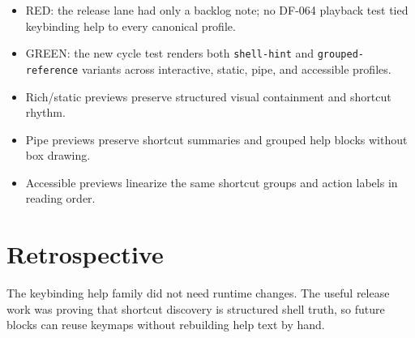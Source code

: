 \begin{itemize}
\tightlist
\item
  RED: the release lane had only a backlog note; no DF-064 playback test tied keybinding help to every canonical profile.
\item
  GREEN: the new cycle test renders both \texttt{s\allowbreak{}h\allowbreak{}e\allowbreak{}l\allowbreak{}l\allowbreak{}-\allowbreak{}h\allowbreak{}i\allowbreak{}n\allowbreak{}t} and \texttt{g\allowbreak{}r\allowbreak{}o\allowbreak{}u\allowbreak{}p\allowbreak{}e\allowbreak{}d\allowbreak{}-\allowbreak{}r\allowbreak{}e\allowbreak{}f\allowbreak{}e\allowbreak{}r\allowbreak{}e\allowbreak{}n\allowbreak{}c\allowbreak{}e} variants across interactive, static, pipe, and accessible profiles.
\item
  Rich/static previews preserve structured visual containment and shortcut rhythm.
\item
  Pipe previews preserve shortcut summaries and grouped help blocks without box drawing.
\item
  Accessible previews linearize the same shortcut groups and action labels in reading order.
\end{itemize}

\section{Retrospective}\label{record-105-retrospective}

The keybinding help family did not need runtime changes. The useful release work was proving that shortcut discovery is structured shell truth, so future blocks can reuse keymaps without rebuilding help text by hand.

